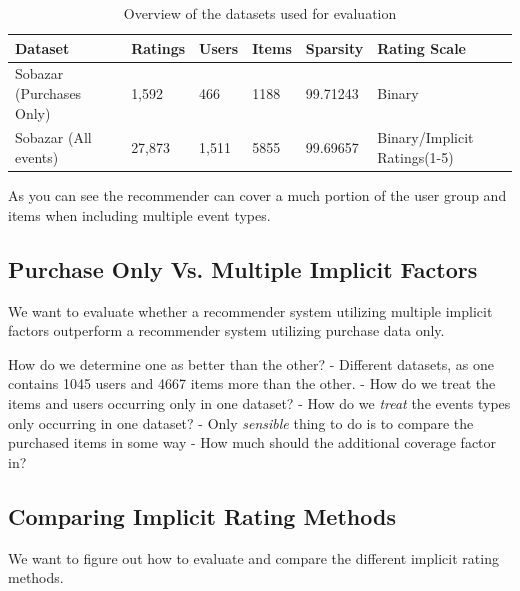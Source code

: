 \begin{table}[H]
    \centering
    \begin{tabular}{l l l l l l }
    \toprule
	Dataset						& 	Ratings	& 	Users		& 	Items 		& 	Sparsity			& Rating Scale 				    \\ \midrule
	Sobazar	(Purchases Only) 	&	1,592	&	466			&	1188		&	99.71243			& Binary						\\
	Sobazar (All events)		& 	27,873  & 	1,511		&	5855		& 	99.69657			& Binary/Implicit Ratings(1-5)	\\ 
	\bottomrule
    \end{tabular}
    \caption [Overview of the datasets used for evaluation]{Overview of the datasets used for evaluation}
    \label{table:datasets}
\end{table}

As you can see the recommender can cover a much portion of the user group and items when including multiple event types.

\subsection{Purchase Only Vs. Multiple Implicit Factors}

We want to evaluate whether a recommender system utilizing multiple implicit factors outperform a recommender system
utilizing purchase data only.

How do we determine one as better than the other?
	- Different datasets, as one contains 1045 users and 4667 items more than the other.
	- How do we treat the items and users occurring only in one dataset?
	- How do we \emph{treat} the events types only occurring in one dataset?
	- Only \emph{sensible} thing to do is to compare the purchased items in some way
	- How much should the additional coverage factor in?


\subsection{Comparing Implicit Rating Methods}

We want to figure out how to evaluate and compare the different implicit rating methods. 


